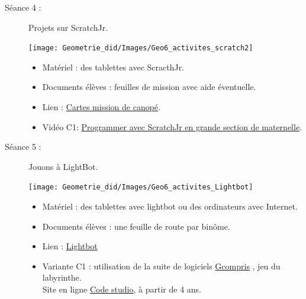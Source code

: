 \begin{exercice*}
\begin{description}
\item[Séance 4 :] Projets sur ScratchJr. \\ [1mm]
\medskip
   \begin{minipage}{8cm}
      \texttt{[image: Geometrie\_did/Images/Geo6\_activites\_scratch2]}
   \end{minipage}
   \begin{minipage}{8.5cm}
      \begin{itemize}
         \item Matériel : des tablettes avec ScracthJr.
         \item Documents élèves : feuilles de mission avec aide éventuelle.
         \item Lien : \href{http://www.reseau-canope.fr/atelier-yvelines/spip.php?article1161}{Cartes mission de canopé}.
         \item Vidéo C1: \href{https://www.youtube.com/watch?v=p8xxyqNYyxw}{Programmer avec ScratchJr en grande section de maternelle}.
      \end{itemize}
   \end{minipage}

\medskip

\item[Séance 5 :] Jouons à LightBot. \\ [1mm]
\medskip
   \begin{minipage}{8cm}
      \texttt{[image: Geometrie\_did/Images/Geo6\_activites\_Lightbot]}
   \end{minipage}
   \begin{minipage}{8.5cm}
      \begin{itemize}
         \item Matériel : des tablettes avec lightbot ou des ordinateurs avec Internet.
         \item Documents élèves : une feuille de route par binôme.
         \item Lien : \href{http://lightbot.com/hour-of-code.html}{Lightbot}
         \item Variante C1 : utilisation de la suite de logiciels \og \href{http://gcompris.net/index-fr.html}{Gcompris} \fg{}, jeu du labyrinthe. \\
         Site en ligne \href{https://studio.code.org/s/course1}{Code studio}, à partir de 4 ans.
      \end{itemize}
   \end{minipage}
  \end{description}
\end{exercice*}


